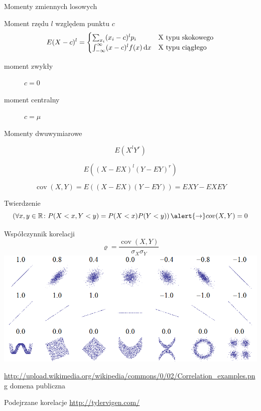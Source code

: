 \documentclass{mp}
\subtitle{Momenty dwuwymiarowe}
\DeclareMathOperator{\cov}{cov}
\begin{document}
\frame{\titlepage}
\begin{frame}{Momenty zmiennych losowych}
\begin{block}{Moment rzędu $l$ względem punktu $c$}
\[ E(X-c)^l=\begin{cases} \sum_{x_i} (x_i-c)^lp_i & $X$\text{ typu skokowego} \\
\int_{-\infty}^\infty (x-c)^lf(x)\d{x} & $X$\text{ typu ciągłego}
\end{cases} \]
\end{block}
\begin{description}
\item[moment zwykły] $c=0$
\item[moment centralny] $c=\mu$
\end{description}
\end{frame}
\begin{frame}{Momenty dwuwymiarowe}
\begin{description}
\item<+->[moment zwykły rzędu $l+r$] \[E(X^lY^r)\]
\item<+->[moment centralny rzędu $l+r$] \[E((X-EX)^l(Y-EY)^r)\]
\item<+->[kowariancja] \[\cov(X,Y)=E((X-EX)(Y-EY))=EXY-EXEY\]
\end{description}
\only<+->
{
\begin{block}{Twierdzenie}
\[\left(\forall x,y\in\R\colon P(X<x,Y<y)=P(X<x)P(Y<y) \right) \alert{\to} cov(X,Y)=0 \]
\end{block}
}
\end{frame}
\begin{frame}{Współczynnik korelacji}
\[\varrho=\frac{\cov(X,Y)}{\sigma_X\sigma_Y} \]
\includegraphics[width=\textwidth]{10_korelacja/Correlation_examples.png}

{\tiny \url{http://upload.wikimedia.org/wikipedia/commons/0/02/Correlation_examples.png} domena publiczna}
\end{frame}
\begin{frame}{Podejrzane korelacje}
\url{http://tylervigen.com/}
\end{frame}
\end{document}
